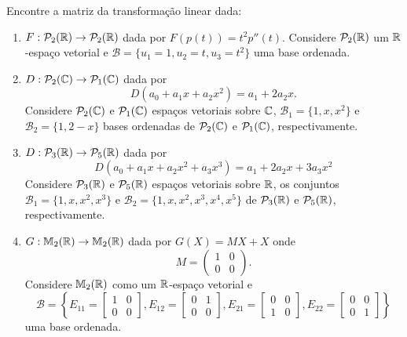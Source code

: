 \documentclass[12pt]{exam}
\begin{document}
\begin{exercicio}
    Encontre a matriz da transformação linear dada:
    \begin{enumerate}[label={\alph*})]
        \item $F : \mathcal{P}_2(\mathbb{R}) \to \mathcal{P}_2(\mathbb{R})$ dada por $F(p(t)) = t^2p''(t)$. Considere $\mathcal{P}_2(\mathbb{R})$ um $\mathbb{R}$-espaço vetorial e $\mathcal{B} = \{u_1 = 1, u_2 = t, u_3 = t^2\}$ uma base ordenada.

        \item $D : \mathcal{P}_2(\mathbb{C}) \to \mathcal{P}_1(\mathbb{C})$ dada por
        \[
        D(a_0 + a_1x + a_2x^2) = a_1 + 2a_2x.
        \]
        Considere $\mathcal{P}_2(\mathbb{C})$ e $\mathcal{P}_1(\mathbb{C})$ espaços vetoriais sobre $\mathbb{C}$, $\mathcal{B}_1 = \{1, x, x^2\}$ e $\mathcal{B}_2 = \{1, 2 - x\}$ bases ordenadas de $\mathcal{P}_2(\mathbb{C})$ e $\mathcal{P}_1(\mathbb{C})$, respectivamente.

        \item $D : \mathcal{P}_3(\mathbb{R}) \to \mathcal{P}_5(\mathbb{R})$ dada por
        \[
        D(a_0 + a_1x + a_2x^2 + a_3x^3) = a_1 + 2a_2x + 3a_3x^2
        \]
        Considere $\mathcal{P}_3(\mathbb{R})$ e $\mathcal{P}_5(\mathbb{R})$ espaços vetoriais sobre $\mathbb{R}$, os conjuntos $\mathcal{B}_1 = \{1, x, x^2, x^3\}$ e $\mathcal{B}_2 = \{1, x, x^2, x^3, x^4, x^5\}$ de $\mathcal{P}_3(\mathbb{R})$ e $\mathcal{P}_5(\mathbb{R})$, respectivamente.

        \item $G : \mathbb{M}_2(\mathbb{R}) \to \mathbb{M}_2(\mathbb{R})$ dada por $G(X) = MX + X$ onde
        \[
        M = \begin{pmatrix}
            1 & 0\\
            0 & 0
        \end{pmatrix}.
        \]
        Considere $\mathbb{M}_2(\mathbb{R})$ como um $\mathbb{R}$-espaço vetorial e
        \[
        \mathcal{B} = \left\{E_{11} = \begin{bmatrix}
            1 & 0\\0 & 0
        \end{bmatrix}, E_{12} = \begin{bmatrix}
            0 & 1\\0 & 0
        \end{bmatrix}, E_{21} = \begin{bmatrix}
            0 & 0\\1 & 0
        \end{bmatrix}, E_{22} = \begin{bmatrix}
            0 & 0\\0 & 1
        \end{bmatrix}\right\}
        \]
        uma base ordenada.


\end{enumerate}
\end{exercicio}
\end{document}
